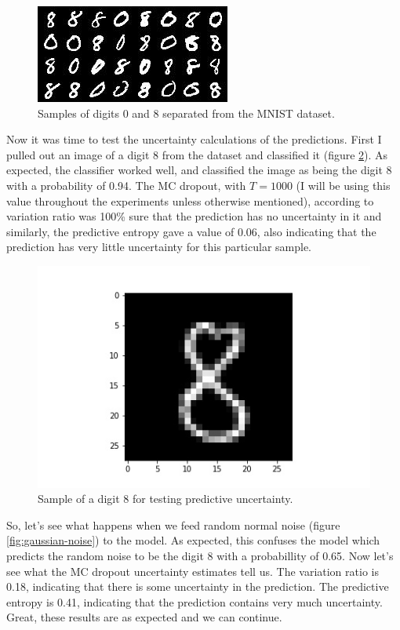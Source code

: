 \documentclass[11pt]{article}
\begin{document}
\begin{figure}
    \center
    \includegraphics{images/mnist-0-8}
    \caption{Samples of digits 0 and 8 separated from the MNIST dataset.}
    \label{fig:mnist-0-8}
\end{figure}

Now it was time to test the uncertainty calculations of the predictions. First I pulled out an image of a digit 8 from the dataset and classified it (figure \ref{fig:eight}). As expected, the classifier worked well, and classified the image as being the digit 8 with a probability of 0.94. The MC dropout, with $T=1000$ (I will be using this value throughout the experiments unless otherwise mentioned), according to variation ratio was 100\% sure that the prediction has no uncertainty in it and similarly, the predictive entropy gave a value of 0.06, also indicating that the prediction has very little uncertainty for this particular sample.

\begin{figure}
    \center
    \includegraphics[scale=0.5]{images/eight}
    \caption{Sample of a digit 8 for testing predictive uncertainty.}
    \label{fig:eight}
\end{figure}

So, let's see what happens when we feed random normal noise (figure \ref{fig:gaussian-noise}) to the model. As expected, this confuses the model which predicts the random noise to be the digit 8 with a probabillity of 0.65. Now let's see what the MC dropout uncertainty estimates tell us. The variation ratio is 0.18, indicating that there is some uncertainty in the prediction. The predictive entropy is 0.41, indicating that the prediction contains very much uncertainty. Great, these results are as expected and we can continue.
\end{document}
